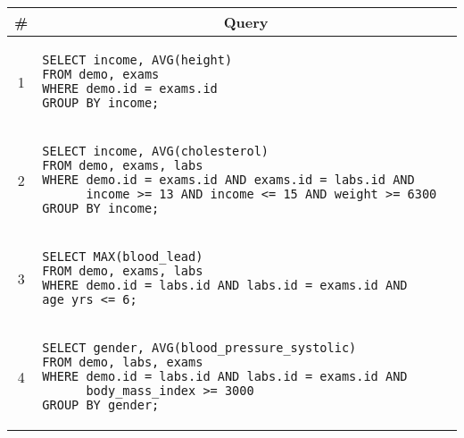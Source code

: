 \begin{tabular}{cl}
\toprule
\# & \multicolumn{1}{c}{Query} \\
\midrule
1 & 
\begin{minipage}{6in}
\begin{lstlisting}[breaklines]
SELECT income, AVG(height)
FROM demo, exams
WHERE demo.id = exams.id
GROUP BY income;
\end{lstlisting}
\end{minipage}{queryno} \label[query]{q1} \\
2 & 
\begin{minipage}{6in}
\begin{lstlisting}[breaklines]
SELECT income, AVG(cholesterol)
FROM demo, exams, labs
WHERE demo.id = exams.id AND exams.id = labs.id AND
      income >= 13 AND income <= 15 AND weight >= 6300
GROUP BY income;
\end{lstlisting}
\end{minipage}
{queryno} \label[query]{q2} \\
3 & 
\begin{minipage}{6in}
\begin{lstlisting}[breaklines]
SELECT MAX(blood_lead)
FROM demo, exams, labs
WHERE demo.id = labs.id AND labs.id = exams.id AND age_yrs <= 6;
\end{lstlisting}
\end{minipage}{queryno} \label[query]{q3}\\
4 & 
\begin{minipage}{6in}
\begin{lstlisting}[breaklines]
SELECT gender, AVG(blood_pressure_systolic)
FROM demo, labs, exams
WHERE demo.id = labs.id AND labs.id = exams.id AND
      body_mass_index >= 3000
GROUP BY gender;
\end{lstlisting}
\end{minipage}{queryno} \label[query]{q4}\\
\bottomrule
\end{tabular}
